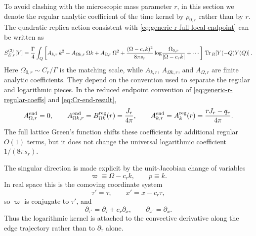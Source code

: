 \documentclass[aps,prx,preprint,amsmath,amssymb]{revtex4-2}
\newcommand{\Tr}{{\rm \, Tr\,}}
\begin{document}
To avoid clashing with the microscopic mass parameter \(r\), in this section we
denote the regular analytic coefficient of the time kernel by \(\rho_{0,r}\)
rather than by \(r\).  The quadratic replica action consistent with
\eqref{eq:generic-r-full-local-endpoint} can be written as
\begin{equation}\label{eq:SE-Y-generic-r-lab}
S_{E,r}^{(2)}[Y]
=
\frac{\Gamma}{4}\int_Q
\left[
A_{k,r}\,k^2
-A_{\Omega k,r}\,\Omega k
+A_{\Omega,r}\,\Omega^2
+\frac{(\Omega-c_r k)^2}{8\pi s_r}
\log\!\frac{\Omega_{0,r}}{|\Omega-c_r k|}
+\cdots
\right]
\Tr_R\!\left[Y(-Q)Y(Q)\right].
\end{equation}
Here \(\Omega_{0,r}\sim C_r/\Gamma\) is the matching scale, while
\(A_{k,r}\), \(A_{\Omega k,r}\), and \(A_{\Omega,r}\) are finite analytic
coefficients.  They depend on the convention used to separate the regular and
logarithmic pieces.  In the reduced endpoint convention of
\eqref{eq:generic-r-regular-coeffs} and \eqref{eq:Cr-end-result},
\begin{equation}\label{eq:generic-r-endpoint-bare}
A_{\Omega,r}^{\rm end}=0,
\qquad
A_{\Omega k,r}^{\rm end}=B_{\Omega k}^{\rm reg}(r)=\frac{J_r}{4\pi},
\qquad
A_{k,r}^{\rm end}=A_k^{\rm reg}(r)=\frac{rJ_r-q_r}{4\pi}.
\end{equation}
The full lattice Green's function shifts these coefficients by additional
regular \(O(1)\) terms, but it does not change the universal logarithmic
coefficient \(1/(8\pi s_r)\).

The singular direction is made explicit by the unit-Jacobian change of
variables
\begin{equation}\label{eq:generic-r-ballistic-vars}
\varpi\equiv \Omega-c_r k,
\qquad
p\equiv k.
\end{equation}
In real space this is the comoving coordinate system
\begin{equation}
\tau'=\tau,
\qquad
x'=x-c_r\tau,
\end{equation}
so \(\varpi\) is conjugate to \(\tau'\), and
\begin{equation}
\partial_{\tau'}=\partial_\tau+c_r\partial_x,
\qquad
\partial_{x'}=\partial_x.
\end{equation}
Thus the logarithmic kernel is attached to the convective derivative along the
edge trajectory rather than to \(\partial_\tau\) alone.
\end{document}
